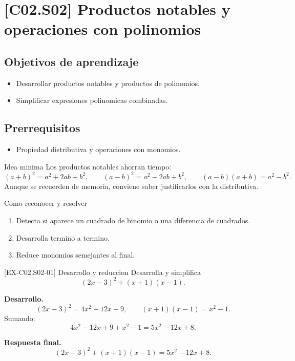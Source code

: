 \section{[C02.S02] Productos notables y operaciones con polinomios}

\subsection*{Objetivos de aprendizaje}
\begin{itemize}
  \item Desarrollar productos notables y productos de polinomios.
  \item Simplificar expresiones polinomicas combinadas.
\end{itemize}

\subsection*{Prerrequisitos}
\begin{itemize}
  \item Propiedad distributiva y operaciones con monomios.
\end{itemize}

\begin{theorybox}{Idea minima}
Los productos notables ahorran tiempo:
\[
(a+b)^2=a^2+2ab+b^2,\qquad (a-b)^2=a^2-2ab+b^2,\qquad (a-b)(a+b)=a^2-b^2.
\]
Aunque se recuerden de memoria, conviene saber justificarlos con la distributiva.
\end{theorybox}

\begin{methodbox}{Como reconocer y resolver}
\begin{enumerate}
  \item Detecta si aparece un cuadrado de binomio o una diferencia de cuadrados.
  \item Desarrolla termino a termino.
  \item Reduce monomios semejantes al final.
\end{enumerate}
\end{methodbox}

\begin{solvedexample}{[EX-C02.S02-01] Desarrollo y reduccion}
Desarrolla y simplifica
\[
(2x-3)^2+(x+1)(x-1).
\]

\textbf{Desarrollo.}
\[
(2x-3)^2=4x^2-12x+9,
\qquad
(x+1)(x-1)=x^2-1.
\]
Sumando:
\[
4x^2-12x+9+x^2-1=5x^2-12x+8.
\]

\textbf{Respuesta final.}
\[
(2x-3)^2+(x+1)(x-1)=5x^2-12x+8.
\]
\end{solvedexample}

